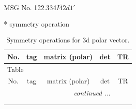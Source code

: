\documentclass[fleqn,8pt]{jsarticle}
\begin{document}
\setcounter{MaxMatrixCols}{32}

\renewcommand{\tablename}{Table~}
\renewcommand{\figurename}{Figure~}
\begin{center}
\LARGE
MSG No. 122.334\quad$I\bar{4}2d1'$
\end{center}
* symmetry operation
\renewcommand{\arraystretch}{1.3}
\begin{longtable}{ccccc}
\caption{Symmetry operations for 3d polar vector.}
 \\
 \hline \hline
No. & tag & matrix (polar) & det & TR \\ \hline \endfirsthead

\multicolumn{4}{l}{\tablename\ \thetable{}} \\
 \hline \hline
No. & tag & matrix (polar) & det & TR \\ \hline \endhead

 \hline \hline
\multicolumn{4}{r}{\footnotesize\it continued ...} \\ \endfoot

 \hline \hline
\multicolumn{4}{r}{} \\ \endlastfoot


\end{longtable}
\end{document}
